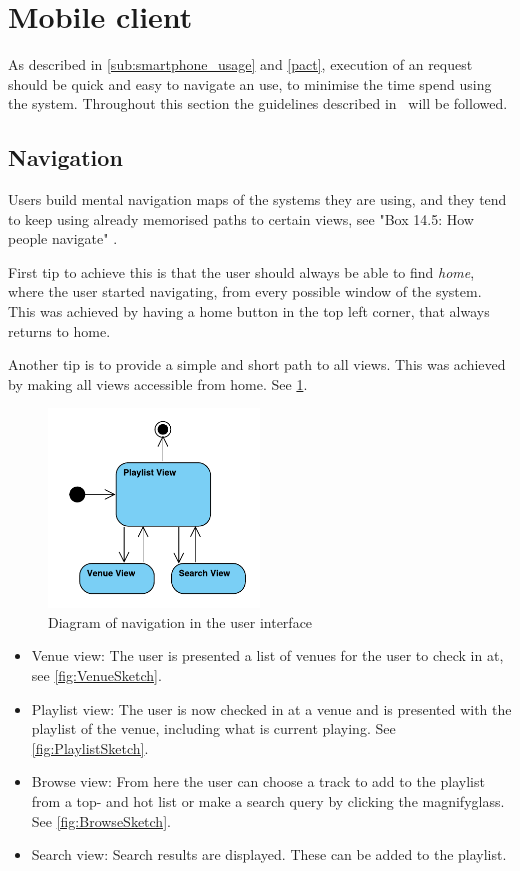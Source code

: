 \section{Mobile client}

As described in \cref{sub:smartphone_usage} and \cref{pact}, execution
of an request should be quick and easy to navigate an use, to minimise
the time spend using the system. Throughout this section the
guidelines described in~\cite{DEB} will be followed.

\subsection{Navigation}

Users build mental navigation maps of the systems they are using, and
they tend to keep using already memorised paths to certain views, see
"Box 14.5: How people navigate" \cite{DEB}. 

First tip to achieve this is that the user should always be able to find \emph{home}, where the user started navigating, from every possible window of the system. This was achieved by having a home button in the top left corner, that always returns to home.

Another tip is to provide a simple and short path to all views. This
was achieved by making all views accessible from home. See \cref{fig:UserInterface}.

\begin{figure}[hbtp]
  \centering
  \includegraphics[width=0.5\textwidth]{Images/UserInterface.pdf}
  \caption{Diagram of navigation in the user interface}\label{fig:UserInterface}
\end{figure}

\begin{itemize}
\item Venue view: The user is presented a list of venues for the user to check in at, see \cref{fig:VenueSketch}.
\item Playlist view: The user is now checked in at a venue and is presented with the playlist of the venue, including what is current playing. See \cref{fig:PlaylistSketch}.
\item Browse view: From here the user can choose a track to add to the playlist from a top- and hot list or make a search query by clicking the magnifyglass. See \cref{fig:BrowseSketch}.
\item Search view: Search results are displayed. These can be added to
  the playlist.
\end{itemize}

